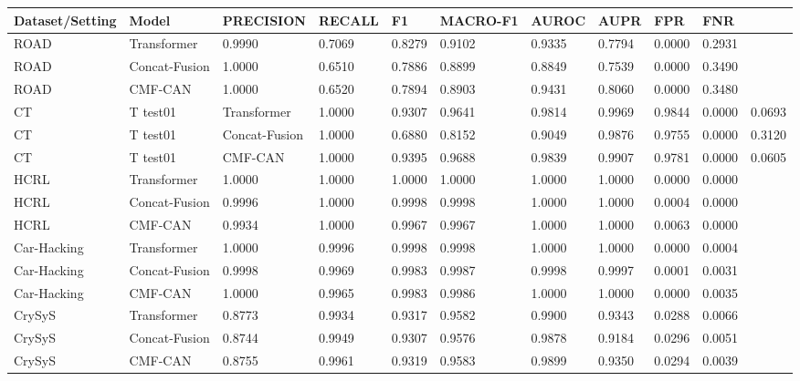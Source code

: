 \begin{tabular}{llllllllll}
\toprule
Dataset/Setting & Model & PRECISION & RECALL & F1 & MACRO-F1 & AUROC & AUPR & FPR & FNR \\
\midrule
ROAD & Transformer & 0.9990 & 0.7069 & 0.8279 & 0.9102 & 0.9335 & 0.7794 & 0.0000 & 0.2931 \\
ROAD & Concat-Fusion & 1.0000 & 0.6510 & 0.7886 & 0.8899 & 0.8849 & 0.7539 & 0.0000 & 0.3490 \\
ROAD & CMF-CAN & 1.0000 & 0.6520 & 0.7894 & 0.8903 & 0.9431 & 0.8060 & 0.0000 & 0.3480 \\
CT&T test01 & Transformer & 1.0000 & 0.9307 & 0.9641 & 0.9814 & 0.9969 & 0.9844 & 0.0000 & 0.0693 \\
CT&T test01 & Concat-Fusion & 1.0000 & 0.6880 & 0.8152 & 0.9049 & 0.9876 & 0.9755 & 0.0000 & 0.3120 \\
CT&T test01 & CMF-CAN & 1.0000 & 0.9395 & 0.9688 & 0.9839 & 0.9907 & 0.9781 & 0.0000 & 0.0605 \\
HCRL & Transformer & 1.0000 & 1.0000 & 1.0000 & 1.0000 & 1.0000 & 1.0000 & 0.0000 & 0.0000 \\
HCRL & Concat-Fusion & 0.9996 & 1.0000 & 0.9998 & 0.9998 & 1.0000 & 1.0000 & 0.0004 & 0.0000 \\
HCRL & CMF-CAN & 0.9934 & 1.0000 & 0.9967 & 0.9967 & 1.0000 & 1.0000 & 0.0063 & 0.0000 \\
Car-Hacking & Transformer & 1.0000 & 0.9996 & 0.9998 & 0.9998 & 1.0000 & 1.0000 & 0.0000 & 0.0004 \\
Car-Hacking & Concat-Fusion & 0.9998 & 0.9969 & 0.9983 & 0.9987 & 0.9998 & 0.9997 & 0.0001 & 0.0031 \\
Car-Hacking & CMF-CAN & 1.0000 & 0.9965 & 0.9983 & 0.9986 & 1.0000 & 1.0000 & 0.0000 & 0.0035 \\
CrySyS & Transformer & 0.8773 & 0.9934 & 0.9317 & 0.9582 & 0.9900 & 0.9343 & 0.0288 & 0.0066 \\
CrySyS & Concat-Fusion & 0.8744 & 0.9949 & 0.9307 & 0.9576 & 0.9878 & 0.9184 & 0.0296 & 0.0051 \\
CrySyS & CMF-CAN & 0.8755 & 0.9961 & 0.9319 & 0.9583 & 0.9899 & 0.9350 & 0.0294 & 0.0039 \\
\bottomrule
\end{tabular}
